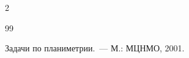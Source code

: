 \begin{multicols}{2}
{{\begin{thebibliography}{99}
\label{end\stat}









Задачи по планиметрии.~--- М.: \mbox{МЦНМО}, 2001.








 \end{thebibliography}


}


}








\end{multicols}


